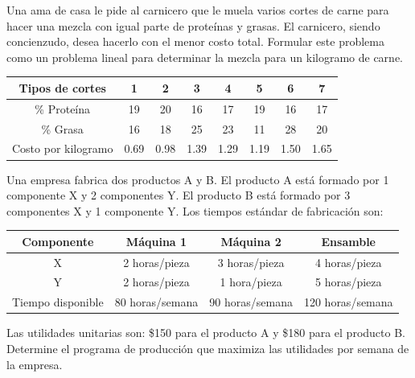 \begin{Ejer}
Una ama de casa le pide al carnicero que le muela varios cortes de carne para hacer una mezcla con igual parte de prote\'inas y grasas. El carnicero, siendo concienzudo, desea hacerlo con el menor costo total. Formular este problema como un problema lineal para determinar la mezcla para un kilogramo de carne.

\begin{center}
\begin{tabular}{c|ccccccc}
Tipos de cortes & 1 & 2 & 3 & 4 & 5 & 6 & 7 \\
\hline
\% Prote\'ina & 19 & 20 & 16 & 17 & 19 & 16 & 17 \\
\% Grasa & 16 & 18 & 25 & 23 & 11 & 28 & 20 \\
Costo por kilogramo & 0.69 & 0.98 & 1.39 & 1.29 & 1.19 & 1.50 & 1.65 \\
\end{tabular}
\end{center}
\end{Ejer}

\begin{Ejer}
Una empresa fabrica dos productos A y B. El producto A est\'a formado por 1 componente X y 2 componentes Y. El producto B est\'a formado por 3 componentes X y 1 componente Y. Los tiempos est\'andar de fabricaci\'on son:

\begin{center}
\begin{tabular}{c|ccc}
Componente & M\'aquina 1 & M\'aquina 2 & Ensamble \\
\hline
X & 2 horas/pieza & 3 horas/pieza & 4 horas/pieza \\
Y & 2 horas/pieza & 1 hora/pieza & 5 horas/pieza \\
\hline
Tiempo disponible & 80 horas/semana & 90 horas/semana & 120 horas/semana \\
\end{tabular}
\end{center}

Las utilidades unitarias son: \$150 para el producto A y \$180 para el producto B. Determine el programa de producci\'on que maximiza las utilidades por semana de la empresa.
\end{Ejer}

